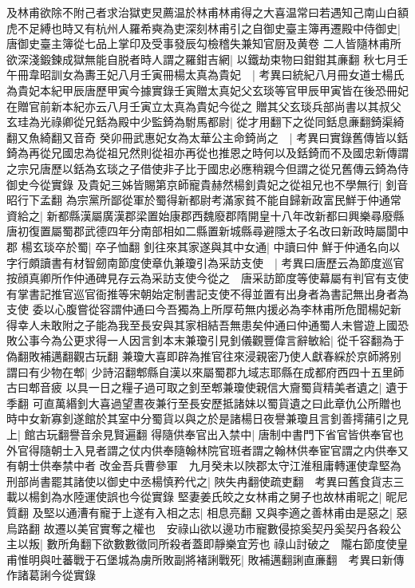 及林甫欲除不附己者求治獄吏炅薦温於林甫林甫得之大喜温常曰若遇知己南山白額虎不足縛也時又有杭州人羅希奭為吏深刻林甫引之自御史臺主簿再遷殿中侍御史|{
	唐御史臺主簿從七品上掌印及受事發辰勾檢稽失兼知官厨及黄卷}
二人皆隨林甫所欲深淺鍛鍊成獄無能自脱者時人謂之羅鉗吉網|{
	以鐵劫束物曰鉗鉗其亷翻}
秋七月壬午冊韋昭訓女為夀王妃八月壬寅冊楊太真為貴妃　|{
	考異曰統紀八月冊女道士楊氏為貴妃本紀甲辰唐歷甲寅今據實錄壬寅贈太真妃父玄琰等官甲辰甲寅皆在後恐冊妃在贈官前新本紀亦云八月壬寅立太真為貴妃今從之}
贈其父玄琰兵部尚書以其叔父玄珪為光祿卿從兄銛為殿中少監錡為駙馬都尉|{
	從才用翻下之從同銛息亷翻錡渠綺翻又魚綺翻又音奇}
癸卯冊武惠妃女為太華公主命錡尚之　|{
	考異曰實錄舊傳皆以銛錡為再從兄國忠為從祖兄然則從祖亦再從也推恩之時何以及銛錡而不及國忠新傳謂之宗兄唐歷以銛為玄琰之子借使非子比于國忠必應稍親今但謂之從兄舊傳云錡為侍御史今從實錄}
及貴妃三姊皆賜第京師寵貴赫然楊釗貴妃之從祖兄也不學無行|{
	釗音昭行下孟翻}
為宗黨所鄙從軍於蜀得新都尉考滿家貧不能自歸新政富民鮮于仲通常資給之|{
	新都縣漢屬廣漢郡梁置始康郡西魏廢郡隋開皇十八年改新都曰興樂尋廢縣唐初復置屬蜀郡武德四年分南部相如二縣置新城縣尋避隱太子名改曰新政時屬閬中郡}
楊玄琰卒於蜀|{
	卒子恤翻}
釗往來其家遂與其中女通|{
	中讀曰仲}
鮮于仲通名向以字行頗讀書有材智劒南節度使章仇兼瓊引為采訪支使　|{
	考異曰唐歷云為節度巡官按顔真卿所作仲通碑見存云為采訪支使今從之　唐采訪節度等使幕屬有判官有支使有掌書記推官巡官衙推等宋朝始定制書記支使不得並置有出身者為書記無出身者為支使}
委以心腹嘗從容謂仲通曰今吾獨為上所厚苟無内援必為李林甫所危聞楊妃新得幸人未敢附之子能為我至長安與其家相結吾無患矣仲通曰仲通蜀人未嘗遊上國恐敗公事今為公更求得一人因言釗本末兼瓊引見釗儀觀豐偉言辭敏給|{
	從千容翻為于偽翻敗補邁翻觀古玩翻}
兼瓊大喜即辟為推官往來浸親密乃使人獻春綵於京師將别謂曰有少物在郫|{
	少詩沼翻郫縣自漢以來屬蜀郡九域志耶縣在成都府西四十五里師古曰郫音疲}
以具一日之糧子過可取之釗至郫兼瓊使親信大齎蜀貨精美者遺之|{
	遺于季翻}
可直萬緡釗大喜過望晝夜兼行至長安歷抵諸妹以蜀貨遺之曰此章仇公所贈也時中女新寡釗遂館於其室中分蜀貨以與之於是諸楊日夜譽兼瓊且言釗善摴蒱引之見上|{
	館古玩翻譽音余見賢遍翻}
得隨供奉官出入禁中|{
	唐制中書門下省官皆供奉官也外官得隨朝士入見者謂之仗内供奉隨翰林院官班者謂之翰林供奉宦官謂之内供奉又有朝士供奉禁中者}
改金吾兵曹參軍　九月癸未以陜郡太守江淮租庸轉運使韋堅為刑部尚書罷其諸使以御史中丞楊慎矜代之|{
	陜失冉翻使疏吏翻　考異曰舊食貨志三載以楊釗為水陸運使誤也今從實錄}
堅妻姜氏皎之女林甫之舅子也故林甫昵之|{
	昵尼質翻}
及堅以通漕有寵于上遂有入相之志|{
	相息亮翻}
又與李適之善林甫由是惡之|{
	惡烏路翻}
故遷以美官實奪之權也　安祿山欲以邊功市寵數侵掠奚契丹奚契丹各殺公主以叛|{
	數所角翻下欲數數徵同所殺者蓋即靜樂宜芳也}
祿山討破之　隴右節度使皇甫惟明與吐蕃戰于石堡城為虜所敗副將褚誗戰死|{
	敗補邁翻誗直亷翻　考異曰新傳作諸葛誗今從實錄}
